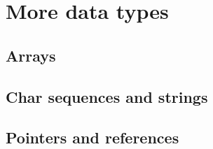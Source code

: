 


\section{More data types}

\subsection{Arrays}



\subsection{Char sequences and strings}



\subsection{Pointers and references}

